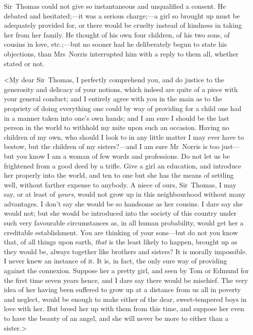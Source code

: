 Sir~Thomas could not give so instantaneous and unqualified a consent. He debated and hesitated;—it was a serious charge;—a girl so brought up must be adequately provided for, or there would be cruelty instead of kindness in taking her from her family. He thought of his own four children, of his two sons, of cousins in love, etc.;—but no sooner had he deliberately begun to state his objections, than Mrs~Norris interrupted him with a reply to them all, whether stated or not.

<My dear Sir~Thomas, I perfectly comprehend you, and do justice to the generosity and delicacy of your notions, which indeed are quite of a piece with your general conduct; and I entirely agree with you in the main as to the propriety of doing everything one could by way of providing for a child one had in a manner taken into one's own hands; and I am sure I should be the last person in the world to withhold my mite upon such an occasion. Having no children of my own, who should I look to in any little matter I may ever have to bestow, but the children of my sisters?—and I am sure Mr~Norris is too just—but you know I am a woman of few words and professions. Do not let us be frightened from a good deed by a trifle. Give a girl an education, and introduce her properly into the world, and ten to one but she has the means of settling well, without farther expense to anybody. A niece of ours, Sir~Thomas, I may say, or at least of \textit{yours}, would not grow up in this neighbourhood without many advantages. I don't say she would be so handsome as her cousins. I dare say she would not; but she would be introduced into the society of this country under such very favourable circumstances as, in all human probability, would get her a creditable establishment. You are thinking of your sons—but do not you know that, of all things upon earth, \textit{that}  is the least likely to happen, brought up as they would be, always together like brothers and sisters? It is morally impossible. I never knew an instance of it. It is, in fact, the only sure way of providing against the connexion. Suppose her a pretty girl, and seen by Tom or Edmund for the first time seven years hence, and I dare say there would be mischief. The very idea of her having been suffered to grow up at a distance from us all in poverty and neglect, would be enough to make either of the dear, sweet-tempered boys in love with her. But breed her up with them from this time, and suppose her even to have the beauty of an angel, and she will never be more to either than a sister.>

